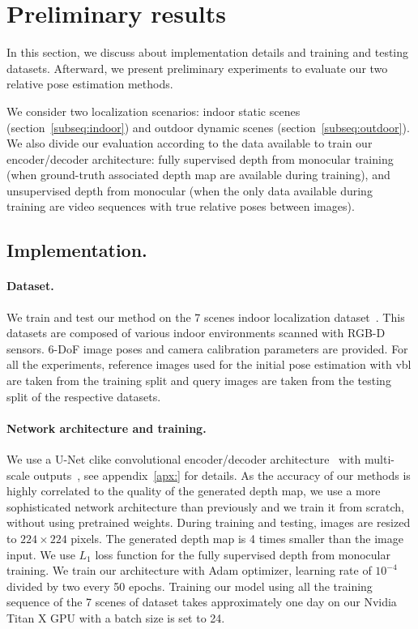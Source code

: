\section{Preliminary results}
\label{sec:implementation}
In this section, we discuss about implementation details and training and testing datasets. Afterward, we present preliminary experiments to evaluate our two relative pose estimation methods. 

We consider two localization scenarios: indoor static scenes (section~\ref{subseq:indoor}) and outdoor dynamic scenes (section~\ref{subseq:outdoor}). We also divide our evaluation according to the data available to train our encoder/decoder architecture: fully supervised depth from monocular training (when ground-truth associated depth map are available during training), and unsupervised depth from monocular (when the only data available during training are video sequences with true relative poses between images).

\subsection{Implementation.}
\paragraph{Dataset.} We train and test our method on the 7 scenes indoor localization dataset~\citep{Shotton2013}. This datasets are composed of various indoor environments scanned with RGB-D sensors.  6-DoF image poses and camera calibration parameters are provided. For all the experiments, reference images used for the initial pose estimation with \ac{vbl} are taken from the training split and query images are taken from the testing split of the respective datasets. 

\paragraph{Network architecture and training.} We use a U-Net clike convolutional encoder/decoder architecture~\citep{Isola2017} with multi-scale outputs~\citep{Godard2017}, see appendix~\ref{apx:} for details. As the accuracy of our methods is highly correlated to the quality of the generated depth map, we use a more sophisticated network architecture than previously and we train it from scratch, without using pretrained weights. During training and testing, images are resized to $224 \times 224$ pixels. The generated depth map is 4 times smaller than the image input. We use $L_1$ loss function for the fully supervised depth from monocular training. We train our architecture with Adam optimizer, learning rate of $10^{-4}$ divided by two every 50 epochs. Training our model using all the training sequence of the 7 scenes of \citet{Shotton2013} dataset takes approximately one day on our Nvidia Titan X GPU with a batch size is set to 24.

